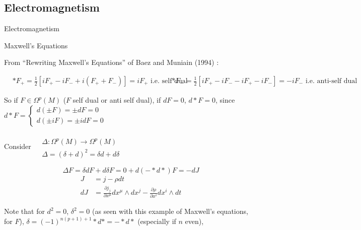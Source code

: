 \documentclass[10pt]{amsart}
\begin{document}
\begin{multicols*}{2}
\section{Electromagnetism}

\begin{description}
\item Electromagnetism
\item Maxwell's Equations
\end{description}

From ``Rewriting Maxwell's Equations'' of Baez and Muniain (1994) \cite{JBaezJMuniain1994}:  


\[
\begin{aligned}
  & *F_+ = \frac{1}{2} \left[ i F_+ -iF_- + i(F_+ + F_-) \right] = iF_+ \text{ i.e. self dual }
  & *F_- = \frac{1}{2} \left[ i F_+ -iF_- - iF_+ -i F_-  \right] = -iF_- \text{ i.e. anti-self dual }
\end{aligned}
\]


So if $F \in \Omega^p(M)$ ($F$ self dual or anti self dual), if $dF=0$, $d*F =0$, since $d*F = \begin{cases} d( \pm F) = \pm dF = 0 \\
  d(\pm iF) = \pm i dF = 0\end{cases}$

Consider $\begin{aligned} & \quad \\
  & \Delta : \Omega^p(M) \to \Omega^p(M) \\
  & \Delta = (\delta +d)^2 = \delta d + d\delta \end{aligned}$

\[
\Delta F = \delta dF + d\delta F = 0 + d (-*d*) F = -dJ 
\]
\[
\begin{aligned}
   J & = j - \rho dt \\ 
   dJ & = \frac{ \partial j_j}{ \partial x^{\mu} } dx^{\mu} \wedge dx^j - \frac{ \partial \rho}{ \partial x^i} dx^i \wedge dt
\end{aligned}
\]


Note that for $d^2 =0$, $\delta^2=0$ (as seen with this example of Maxwell's equations, for $F$), $\delta = (-1)^{n(p+1)+1} *d* = -*d*$ (especially if $n$ even), 


\end{multicols*}
\end{document}
